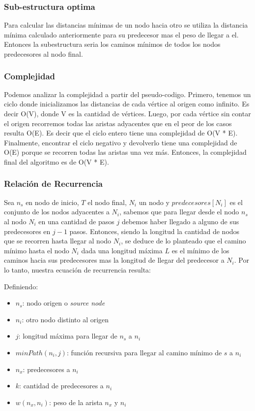 \documentclass[titlepage,a4paper]{article}
\begin{document}
\subsubsection{Sub-estructura optima}
\label{sec:org4539a5f}

Para calcular las distancias mínimas de un nodo hacia otro se utiliza la
distancia mínima calculado anteriormente para su predecesor mas el peso de
llegar a el. Entonces la subestructura seria los caminos mínimos de todos los
nodos predecesores al nodo final.

\subsubsection{Complejidad}
\label{sec:org7d92977}

Podemos analizar la complejidad a partir del pseudo-codigo. Primero, tenemos un
ciclo donde inicializamos las distancias de cada vértice al origen como
infinito. Es decir O(V), donde V es la cantidad de vértices. Luego, por cada
vértice sin contar el origen recorremos todas las aristas adyacentes que en el
peor de los casos resulta O(E). Es decir que el ciclo entero tiene una
complejidad de O(V * E). Finalmente, encontrar el ciclo negativo y devolverlo
tiene una complejidad de O(E) porque se recorren todas las aristas una vez más.
Entonces, la complejidad final del algoritmo es de O(V * E).

\subsubsection{Relación de Recurrencia}
\label{sec:orga913c7a}

Sea \(n_s\) en nodo de inicio, \(T\) el nodo final, \(N_i\) un nodo y \(predecesores[N_i]\) es el
conjunto de los nodos adyacentes a \(N_i\), sabemos que para llegar desde el nodo \(n_s\)
al nodo \(N_i\) en una cantidad de pasos \(j\) debemos haber llegado a alguno de sus
predecesores en \(j-1\) pasos. Entonces, siendo la longitud la cantidad de nodos que
se recorren hasta llegar al nodo \(N_i\), se deduce de lo planteado que el camino
mínimo hasta el nodo \(N_i\) dada una longitud máxima \(L\) es el mínimo de los caminos
hacia sus predecesores mas la longitud de llegar del predecesor a \(N_i\). Por lo
tanto, nuestra ecuación de recurrencia resulta:

Definiendo:
\begin{itemize}
\item \(n_s\): nodo origen o \emph{source node}
\item \(n_i\): otro nodo distinto al origen
\item \(j\): longitud máxima para llegar de \(n_s\) a \(n_i\)
\item \(minPath(n_i, j)\): función recursiva para llegar al camino mínimo de \(s\) a \(n_i\)
\item \(n_x\): predecesores a \(n_i\)
\item \(k\): cantidad de predecesores a \(n_i\)
\item \(w(n_x,n_i)\): peso de la arista \(n_x\) y \(n_i\)
\end{itemize}
\end{document}

